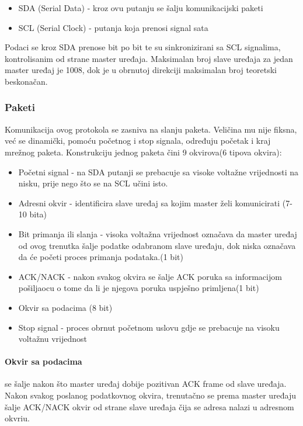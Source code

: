 \documentclass[../Document.tex]{subfiles}
\begin{document}
\begin{itemize}
    \item SDA (Serial Data) - kroz ovu putanju se šalju komunikacijski paketi
    \item SCL (Serial Clock) - putanja koja prenosi signal sata
\end{itemize}

\noindent Podaci se kroz SDA prenose bit po bit te su sinkronizirani sa SCL signalima, kontrolisanim od strane master uređaja. Maksimalan broj slave uređaja za jedan master uređaj je 1008, dok je u obrnutoj direkciji maksimalan broj teoretski beskonačan.

\subsubsection{Paketi}
Komunikacija ovog protokola se zasniva na slanju paketa. Veličina mu nije fiksna, već se dinamički, pomoću početnog i stop signala, određuju početak i kraj mrežnog paketa. Konstrukciju jednog paketa čini 9 okvirova(6 tipova okvira):

\begin{itemize}
    \item Početni signal - na SDA putanji se prebacuje sa visoke voltažne vrijednosti na nisku, prije nego što se na SCL učini isto.
    \item Adresni okvir - identificira slave uređaj sa kojim master želi komunicirati (7-10 bita)
    \item Bit primanja ili slanja - visoka voltažna vrijednost označava da master uređaj od ovog trenutka šalje podatke odabranom slave uređaju, dok niska označava da će početi proces primanja podataka.(1 bit)
    \item ACK/NACK - nakon svakog okvira se šalje ACK poruka sa informacijom pošiljaocu o tome da li je njegova poruka uspješno primljena(1 bit)
    \item Okvir sa podacima (8 bit)
    \item Stop signal - proces obrnut početnom uslovu gdje se prebacuje na visoku voltažnu vrijednost
\end{itemize}


\paragraph{Okvir sa podacima} se šalje nakon što master uređaj dobije pozitivan ACK frame od slave uređaja. Nakon svakog poslanog podatkovnog okvira, trenutačno se prema master uređaju šalje ACK/NACK okvir od strane slave uređaja čija se adresa nalazi u adresnom okvriu.\\
\end{document}
